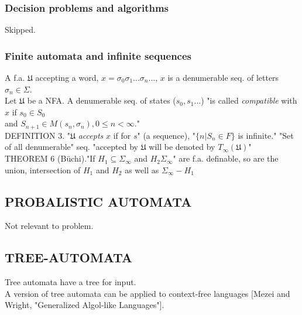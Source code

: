 \subsubsection{Decision problems and algorithms}
Skipped.

\subsubsection{Finite automata and infinite sequences}
A f.a. $\mathfrak{U}$ accepting a word, $x = \sigma_{0} \sigma_{1}...\sigma_{n}...$, $x$ is a denumerable seq. of letters $\sigma_n \in \Sigma$.\\
Let $\mathfrak{U}$ be a NFA. A denumerable seq. of states ($s_{0}, s_{1}...$) "is called \textit{compatible} with $x$ if $s_{0} \in S_{0}$\\ 
and $S_{n+1} \in M(s_{n}, \sigma_{n}),0 \le n < \infty$."\\

DEFINITION 3. "$\mathfrak{U}$ \textit{accepts} $x$ if for $s$" (a sequence), "$\{ n | S_n \in F \}$ is infinite."  "Set of all denumerable" seq. "accepted by $\mathfrak{U}$ will be denoted by $T_{\infty}(\mathfrak{U})$"\\

THEOREM 6 (B{\"u}chi)."If $H_1 \subseteq \Sigma_{\infty}$ and $H_2 \Sigma_{\infty}$" are f.a. definable, so are the union, intersection of $H_1$ and $H_2$ as well as $\Sigma_{\infty} - H_1$

\subsection{PROBALISTIC AUTOMATA}
Not relevant to problem.

\subsection{TREE-AUTOMATA}
Tree automata have a tree for input.\\
A version of tree automata can be applied to context-free languages [Mezei and Wright, "Generalized Algol-like Languages"].\\


